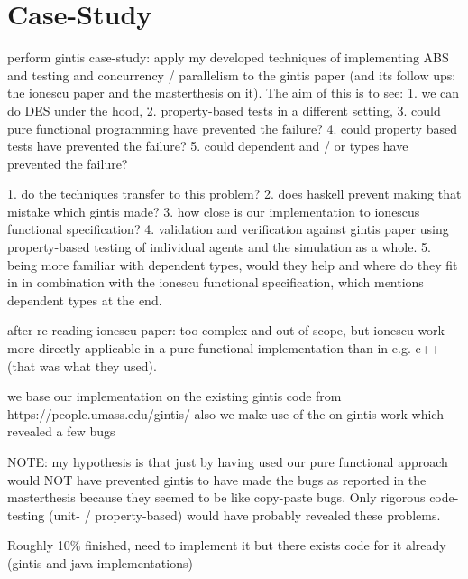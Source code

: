 \chapter{Case-Study}
perform gintis case-study: apply my developed techniques of implementing ABS and testing and concurrency / parallelism to the gintis paper (and its follow ups: the ionescu paper and the masterthesis on it). 
The aim of this is to see: 
1. we can do DES under the hood, 2. property-based tests in a different setting, 3. could pure functional programming have prevented the failure? 4. could property based tests have prevented the failure? 5. could dependent and / or types have prevented the failure? 

1. do the techniques transfer to this problem? 
2. does haskell prevent making that mistake which gintis made? 
3. how close is our implementation to ionescus functional specification? 
4. validation and verification against gintis paper using property-based testing of individual agents and the simulation as a whole. 
5. being more familiar with dependent types, would they help and where do they fit in in combination with the ionescu functional specification, which mentions dependent types at the end.

after re-reading ionescu paper: too complex and out of scope, but ionescu work more directly applicable in a pure functional implementation than in e.g. c++ (that was what they used).

we base our implementation on the existing gintis code from https://people.umass.edu/gintis/ 
also we make use of the \cite{evensen_extensible_2010} on gintis work which revealed a few bugs

NOTE: my hypothesis is that just by having used our pure functional approach would NOT have prevented gintis to have made the bugs as reported in the masterthesis \cite{evensen_extensible_2010} because they seemed to be like copy-paste bugs. Only rigorous code-testing (unit- / property-based) would have probably revealed these problems.

Roughly 10\% finished, need to implement it but there exists code for it already (gintis and java implementations)
